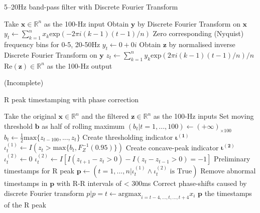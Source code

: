 \documentclass[
]{article}
\begin{document}
\begin{algorithm}
\caption{5--20Hz band-pass filter with Discrete Fourier Transform}
\begin{algorithmic}[1]
\STATE Take $\mathbf{x} \in \mathbb{R}^n$ as the 100-Hz input
\STATE Obtain $\mathbf{y}$ by Discrete Fourier Transform on $\mathbf{x}$
\STATE $y_t \leftarrow \sum_{k = 1}^n{x_k}\text{exp}(-2\pi i(k - 1)(t - 1) / n)$
\ENDFOR
\STATE Zero corresponding (Nyquist) frequency bins for 0-5, 20-50Hz
\STATE $y_t \leftarrow 0 + 0i$
\ENDFOR
\STATE Obtain $\mathbf{z}$ by normalised inverse Discrete Fourier Transform on $\mathbf{y}$
\STATE $z_t \leftarrow \sum_{k = 1}^n{y_k}\text{exp}(2\pi i(k - 1)(t - 1) / n) / n$
\ENDFOR
\RETURN $\text{Re}(\mathbf{z}) \in \mathbb{R}^n$ as the 100-Hz output
\end{algorithmic}
\end{algorithm}

(Incomplete)

\begin{algorithm}
\caption{R peak timestamping with phase correction}
\begin{algorithmic}[1]
\STATE Take the original $\mathbf{x} \in \mathbb{R}^n$ and the filtered $\mathbf{z} \in \mathbb{R}^n$ as the 100-Hz inputs
\STATE Set moving threshold $\mathbf{b}$ as half of rolling maximum
\STATE $(b_t | t = 1, ..., 100) \leftarrow (+\infty)_{\times 100}$
\STATE $b_t \leftarrow \frac{1}{2}\text{max}\{z_{t - 100}, ..., z_t\}$
\ENDFOR
\STATE Create thresholding indicator $\boldsymbol{\iota^{(1)}}$
\STATE $\iota^{(1)}_t \leftarrow I(z_t > \text{max}\{b_t, F^{-1}_{Z}(0.95)\})$
\ENDFOR
\STATE Create concave-peak indicator $\boldsymbol{\iota^{(2)}}$
\STATE $\iota^{(2)}_t \leftarrow 0$
\ENDFOR
{}
\STATE $\iota^{(2)}_t \leftarrow I[I(z_{t + 1} - z_t > 0) - I(z_t - z_{t - 1} > 0) = -1]$
\ENDFOR
\STATE Preliminary timestamps for R peak $\mathbf{p} \leftarrow (t = 1, ..., n | \iota^{(1)}_t \land \iota^{(2)}_t \text{ is True})$
\STATE Remove abnormal timestamps in $\mathbf{p}$ with R-R intervals of < 300ms
\STATE Correct phase-shifts caused by discrete Fourier transform
\STATE $p | p = t \leftarrow \text{argmax}_{i = t - 4, ..., t, ..., t + 4} x_i$
\ENDFOR
\RETURN $\mathbf{p}$ the timestamps of the R peak
\end{algorithmic}
\end{algorithm}
\end{document}
